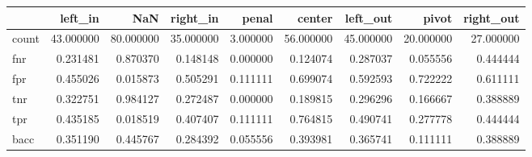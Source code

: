 \begin{tabular}{lrrrrrrrr}
\toprule
{} &    left\_in &        NaN &   right\_in &     penal &     center &   left\_out &      pivot &  right\_out \\
\midrule
count &  43.000000 &  80.000000 &  35.000000 &  3.000000 &  56.000000 &  45.000000 &  20.000000 &  27.000000 \\
fnr   &   0.231481 &   0.870370 &   0.148148 &  0.000000 &   0.124074 &   0.287037 &   0.055556 &   0.444444 \\
fpr   &   0.455026 &   0.015873 &   0.505291 &  0.111111 &   0.699074 &   0.592593 &   0.722222 &   0.611111 \\
tnr   &   0.322751 &   0.984127 &   0.272487 &  0.000000 &   0.189815 &   0.296296 &   0.166667 &   0.388889 \\
tpr   &   0.435185 &   0.018519 &   0.407407 &  0.111111 &   0.764815 &   0.490741 &   0.277778 &   0.444444 \\
bacc  &   0.351190 &   0.445767 &   0.284392 &  0.055556 &   0.393981 &   0.365741 &   0.111111 &   0.388889 \\
\bottomrule
\end{tabular}
